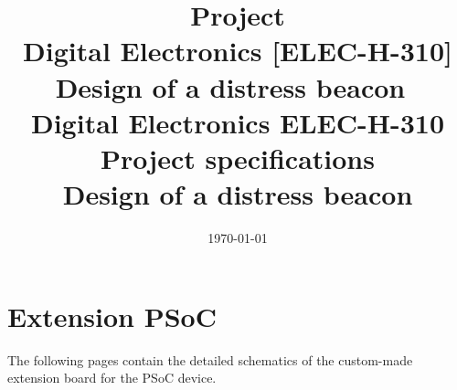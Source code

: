 \documentclass[10pt,a4paper]{article}
\date{\vspace{-1cm}\mydate\today}
\title{\vspace{-2cm} Project\\ Digital Electronics [ELEC-H-310]\\ Design of a distress beacon~\ifthenelse{\boolean{corrige}}{~\\Corrigé}{}}
\title{
Digital Electronics ELEC-H-310\\
Project specifications\\
Design of a distress beacon
}
\date{}
\theoremstyle{definition}%
\begin{document}
\maketitle
\tableofcontents


\newpage

\newpage

\newpage

\newpage

\appendix
\section{Extension PSoC}
The following pages contain the detailed schematics of the custom-made extension board for the PSoC device. 

\end{document}
